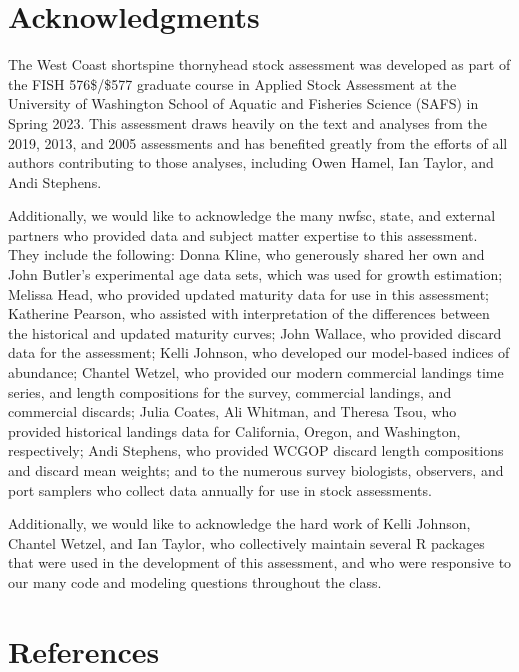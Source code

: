 \documentclass[11pt,
  letterpaper,
]{article}
\begin{document}
\hypertarget{acknowledgments}{%
\section{Acknowledgments}\label{acknowledgments}}

The West Coast shortspine thornyhead stock assessment was developed as part of the FISH 576\$\slash\$577 graduate course in Applied Stock Assessment at the University of Washington School of Aquatic and Fisheries Science (SAFS) in Spring 2023. This assessment draws heavily on the text and analyses from the 2019, 2013, and 2005 assessments and has benefited greatly from the efforts of all authors contributing to those analyses, including Owen Hamel, Ian Taylor, and Andi Stephens.

Additionally, we would like to acknowledge the many \gls{nwfsc}, state, and external partners who provided data and subject matter expertise to this assessment. They include the following: Donna Kline, who generously shared her own and John Butler's experimental age data sets, which was used for growth estimation; Melissa Head, who provided updated maturity data for use in this assessment; Katherine Pearson, who assisted with interpretation of the differences between the historical and updated maturity curves; John Wallace, who provided discard data for the assessment; Kelli Johnson, who developed our model-based indices of abundance; Chantel Wetzel, who provided our modern commercial landings time series, and length compositions for the survey, commercial landings, and commercial discards; Julia Coates, Ali Whitman, and Theresa Tsou, who provided historical landings data for California, Oregon, and Washington, respectively; Andi Stephens, who provided WCGOP discard length compositions and discard mean weights; and to the numerous survey biologists, observers, and port samplers who collect data annually for use in stock assessments.

Additionally, we would like to acknowledge the hard work of Kelli Johnson, Chantel Wetzel, and Ian Taylor, who collectively maintain several R packages that were used in the development of this assessment, and who were responsive to our many code and modeling questions throughout the class.

\clearpage

\hypertarget{references}{%
\section{References}\label{references}}
\end{document}
